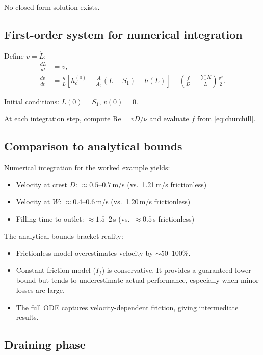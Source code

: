 \documentclass[11pt]{article}
\begin{document}
No closed-form solution exists.

\subsection{First-order system for numerical integration}

Define $v = \dot{L}$:
\begin{align}
  \frac{dL}{dt} &= v, \label{eq:system-L} \\
  \frac{dv}{dt} &= \frac{g}{L}\left[h_c^{(0)} - \frac{A}{A_0}(L - S_1) - h(L)\right] - \left(\frac{f}{D} + \frac{\sum K}{L}\right)\frac{v^2}{2}. \label{eq:system-v}
\end{align}

Initial conditions: $L(0) = S_1$, $v(0) = 0$.

At each integration step, compute $\text{Re} = vD/\nu$ and evaluate $f$ from \eqref{eq:churchill}.

\subsection{Comparison to analytical bounds}

Numerical integration for the worked example yields:
\begin{itemize}[nosep,leftmargin=2em]
  \item Velocity at crest $D$: $\approx 0.5$--$0.7$\,m/s (vs.\ 1.21\,m/s frictionless)
  \item Velocity at $W$: $\approx 0.4$--$0.6$\,m/s (vs.\ 1.20\,m/s frictionless)
  \item Filling time to outlet: $\approx 1.5$--$2$\,s (vs.\ $\approx 0.5$\,s frictionless)
\end{itemize}

The analytical bounds bracket reality:
\begin{itemize}[nosep,leftmargin=2em]
  \item Frictionless model overestimates velocity by $\sim 50$--$100\%$.
  \item Constant-friction model ($I_f$) is conservative. It provides a guaranteed lower bound but tends to underestimate actual performance, especially when minor losses are large.
  \item The full ODE captures velocity-dependent friction, giving intermediate results.
\end{itemize}

\subsection{Draining phase}
\label{sec:draining}
\end{document}
